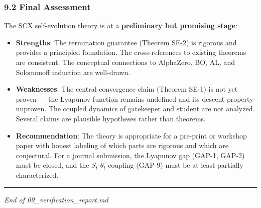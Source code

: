 \documentclass[
  12pt,
]{article}
\begin{document}
\subsubsection{9.2 Final Assessment}\label{final-assessment}

The SCX self-evolution theory is at a \textbf{preliminary but promising
stage}:

\begin{itemize}
\item
  \textbf{Strengths}: The termination guarantee (Theorem SE-2) is
  rigorous and provides a principled foundation. The cross-references to
  existing theorems are consistent. The conceptual connections to
  AlphaZero, BO, AL, and Solomonoff induction are well-drawn.
\item
  \textbf{Weaknesses}: The central convergence claim (Theorem SE-1) is
  not yet proven --- the Lyapunov function remains undefined and its
  descent property unproven. The coupled dynamics of gatekeeper and
  student are not analyzed. Several claims are plausible hypotheses
  rather than theorems.
\item
  \textbf{Recommendation}: The theory is appropriate for a pre-print or
  workshop paper with honest labeling of which parts are rigorous and
  which are conjectural. For a journal submission, the Lyapunov gap
  (GAP-1, GAP-2) must be closed, and the \(S_t\)-\(\theta_t\) coupling
  (GAP-9) must be at least partially characterized.
\end{itemize}

\begin{center}\rule{0.5\linewidth}{0.5pt}\end{center}

\emph{End of 09\_verification\_report.md}
\end{document}
